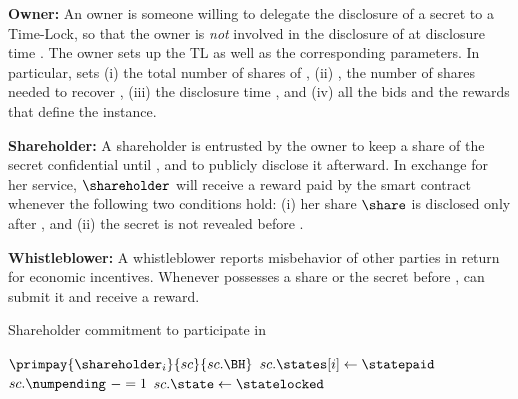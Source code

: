 \begin{asparaitem}
\item {\bf Owner:}	An owner \owner is someone willing to delegate the disclosure of a secret \secret to a Time-Lock, so that the owner is \textit{not} involved in the disclosure of \secret at disclosure time \td.
The owner \owner sets up the TL as well as the corresponding parameters.
In particular, \owner sets (i) \N the total number of shares \share of \secret, (ii) \K, the number of shares needed to recover \secret, (iii) the disclosure time \td, and (iv) all the bids and the rewards that define the instance.


\item {\bf Shareholder:}
A shareholder \shareholder is entrusted by the owner \owner to keep a share \share of the secret \secret confidential until \td, and to publicly disclose it afterward.
In exchange for her service, $\shareholder$ will receive a reward paid by the smart contract whenever the following two conditions hold: (i) her share $\share$ is disclosed only after \td, and (ii) the secret \secret is not revealed before \td.

\item {\bf Whistleblower:}
A whistleblower \whistleblower reports misbehavior of other parties in return for economic incentives.
Whenever \whistleblower possesses a share \share or the secret \secret before \td, \whistleblower can submit it and receive a reward.
\end{asparaitem}


\begin{algorithm}[t]
	\caption{Shareholder commitment to participate in \shortname}\label{algo:shareholder_commitment}
	\begin{algorithmic}[1]
		\vspace{0.6em}
		\vspace*{0.6em}
		
		\State $\primpay{\shareholder_i}{sc}{sc.\BH}$
		\State $sc.\states[i]\gets \statepaid$
		\State $sc.\numpending\ -= 1$
		\State $sc.\state\gets \statelocked$
		\EndIf
		\EndIf
		\EndIf
		\EndProcedure
	\end{algorithmic}
\end{algorithm}

